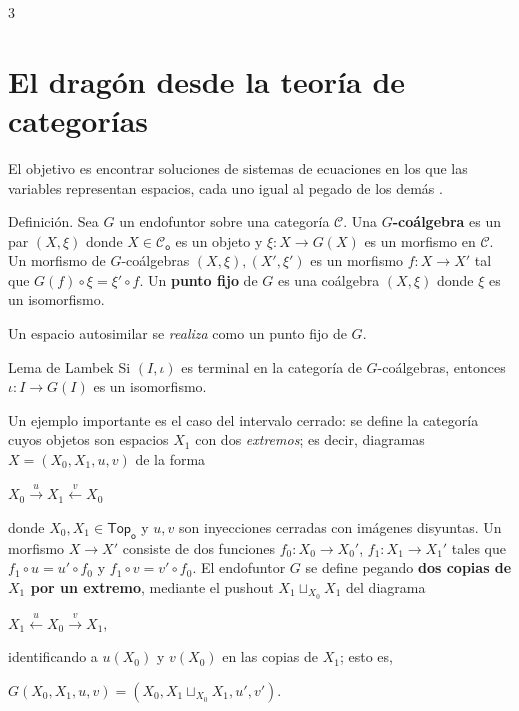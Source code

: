 \documentclass{sciposter}
\begin{document}
\begin{multicols*}{3}
\section{El dragón desde la teoría de categorías}
El objetivo es encontrar soluciones de sistemas de ecuaciones en los que las variables representan espacios, cada uno igual al pegado de los demás \cite{Lei11}.
\begin{defbox}{Definición.}
Sea $G$ un endofuntor sobre una categoría $\mathcal{C}$. Una $G$\textbf{-coálgebra} es un par $(X,\xi)$ donde $X \in \mathcal{C}_\mathsf{o}$ es un objeto y $\xi: X \to G(X)$ es un morfismo en $\mathcal{C}$. Un morfismo de $G$-coálgebras $(X, \xi), (X', \xi')$ es un morfismo $f : X \to X'$ tal que $G(f) \circ \xi = \xi'\circ f$.
Un \textbf{punto fijo} de $G$ es una coálgebra $(X,\xi)$ donde $\xi$ es un isomorfismo.
\end{defbox}
Un espacio autosimilar se \textit{realiza} como un punto fijo de $G$.
\begin{defbox}{Lema de Lambek}
Si $(I, \iota)$ es terminal en la categoría de $G$-coálgebras, entonces $\iota : I \to G(I)$ es un isomorfismo.
\end{defbox}%
Un ejemplo importante es el caso del intervalo cerrado: se define la categoría cuyos objetos son espacios $X_1$ con dos \textit{extremos}; es decir, diagramas $X= (X_0, X_1, u, v)$ de la forma
\begin{center}
$X_0 \xrightarrow{\;u\;} X_1 \xleftarrow{\;v\;} X_0$
\end{center}
donde $X_0, X_1\in \mathsf{Top_o}$ y $u,v$ son inyecciones cerradas con imágenes disyuntas. Un morfismo $X \to X'$ consiste de dos funciones $f_0:X_0 \to X_0'$, $f_1: X_1 \to X_1'$ tales que $f_1 \circ u = u' \circ f_0$ y $f_1 \circ v = v'\circ f_0$.
El endofuntor $G$ se define pegando \textbf{dos copias de $X_1$ por un extremo}, mediante el pushout $X_1 \sqcup_{X_0} X_1$ del diagrama
\begin{center}
$X_1 \xleftarrow{\;u\;} X_0 \xrightarrow{\;v\;} X_1,$
\end{center}
identificando a $u(X_0)$ y $v(X_0)$ en las copias de $X_1$; esto es,
\begin{center}
    $G(X_0, X_1, u, v ) = (X_0, X_1 \sqcup_{X_0} X_1 , u', v')$.
\end{center}

\end{multicols*}
\end{document}
